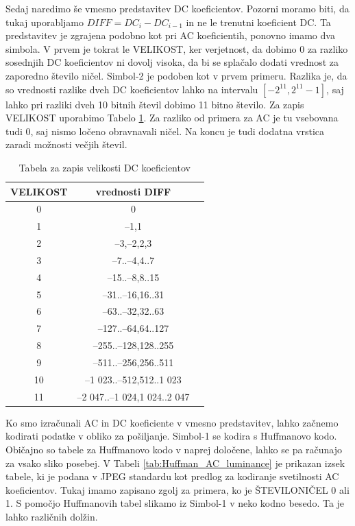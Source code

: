 \documentclass[a4paper,12pt,openright]{book}
\begin{document}
Sedaj naredimo še vmesno predstavitev DC koeficientov. Pozorni moramo biti, da tukaj uporabljamo $DIFF = DC_i - DC_{i-1}$ in ne le trenutni koeficient DC. Ta predstavitev je zgrajena podobno kot pri AC koeficientih, ponovno imamo dva simbola. V prvem je tokrat le VELIKOST, ker verjetnost, da dobimo 0 za razliko sosednjih DC koeficientov ni dovolj visoka, da bi se splačalo dodati vrednost za zaporedno število ničel. Simbol-2 je podoben kot v prvem primeru. Razlika je, da so vrednosti razlike dveh DC koeficientov lahko na intervalu $\left[-2^{11},2^{11}-1\right]$, saj lahko pri razliki dveh 10 bitnih števil dobimo 11 bitno število. Za zapis VELIKOST uporabimo Tabelo \ref{tab:Velikost_DC}. Za razliko od primera za AC je tu vsebovana tudi 0, saj nismo ločeno obravnavali ničel. Na koncu je tudi dodatna vrstica zaradi možnosti večjih števil.\par
\begin{table}[ht]
\centering
\begin{tabular}{|c|c|c|}
\hline
VELIKOST& vrednosti DIFF\\
\hline
 0& 0\\
 1& –1,1\\
 2& –3,–2,2,3\\
 3& –7..–4,4..7\\
 4& –15..–8,8..15\\
 5& –31..–16,16..31\\
 6& –63..–32,32..63\\
 7& –127..–64,64..127\\
 8& –255..–128,128..255\\
 9& –511..–256,256..511\\
10& –1 023..–512,512..1 023\\
11& –2 047..–1 024,1 024..2 047\\
\hline
\end{tabular}
\caption{Tabela za zapis velikosti DC koeficientov}
\label{tab:Velikost_DC}
\end{table}
Ko smo izračunali AC in DC koeficiente v vmesno predstavitev, lahko začnemo kodirati podatke v obliko za pošiljanje. Simbol-1 se kodira s Huffmanovo kodo. Običajno so tabele za Huffmanovo kodo v naprej določene, lahko se pa računajo za vsako sliko posebej. V Tabeli \ref{tab:Huffman_AC_luminance} je prikazan izsek tabele, ki je podana v JPEG standardu kot predlog za kodiranje svetilnosti AC koeficientov. Tukaj imamo zapisano zgolj za primera, ko je ŠTEVILONIČEL 0 ali 1. S pomočjo Huffmanovih tabel slikamo iz Simbol-1 v neko kodno besedo. Ta je lahko različnih dolžin. \par
\end{document}
